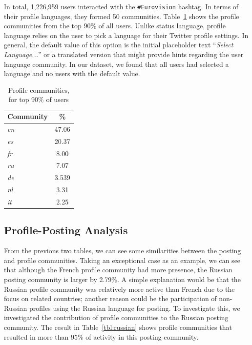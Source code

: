 \documentclass[conference]{IEEEtran}
\begin{document}
In total, 1,226,959 users interacted with the {\texttt{\#Eurovision}}
hashtag. In terms of their profile languages, they formed 50
communities. Table~\ref{tbl:profcomms} shows the profile communities
from the top 90\% of all users. Unlike status language, profile
language relies on the user to pick a language for their Twitter
profile settings. In general, the default value of this option is the
initial placeholder text ``{\emph{Select Language...}}'' or a
translated version that might provide hints regarding the user
language community. In our dataset, we found that all users had
selected a language and no users with the default value.


\begin{table}[!htb]
\centering
\begin{tabular}{@{}lc}
\toprule
\textbf{Community} & \textbf{\%} \\ 
\midrule
{\emph{en}} & 47.06 \\
{\emph{es}} & 20.37 \\
{\emph{fr}} & 8.00 \\
{\emph{ru}} & 7.07 \\
{\emph{de}} & 3.539 \\
{\emph{nl}} & 3.31 \\
{\emph{it}} & 2.25 \\ 
\bottomrule
\end{tabular}
\caption{Profile communities, for top 90\% of users}
\label{tbl:profcomms}
\end{table}


\subsection{Profile-Posting Analysis}

From the previous two tables, we can see some similarities between the
posting and profile communities. Taking an exceptional case as an
example, we can see that although the French profile community had
more presence, the Russian posting community is larger by 2.79\%. A
simple explanation would be that the Russian profile community was
relatively more active than French due to the focus on related
countries; another reason could be the participation of non-Russian
profiles using the Russian language for posting. To investigate this,
we investigated the contribution of profile communities to the Russian
posting community. The result in Table~\ref{tbl:russian} shows profile
communities that resulted in more than 95\% of activity in this
posting community.
\end{document}
